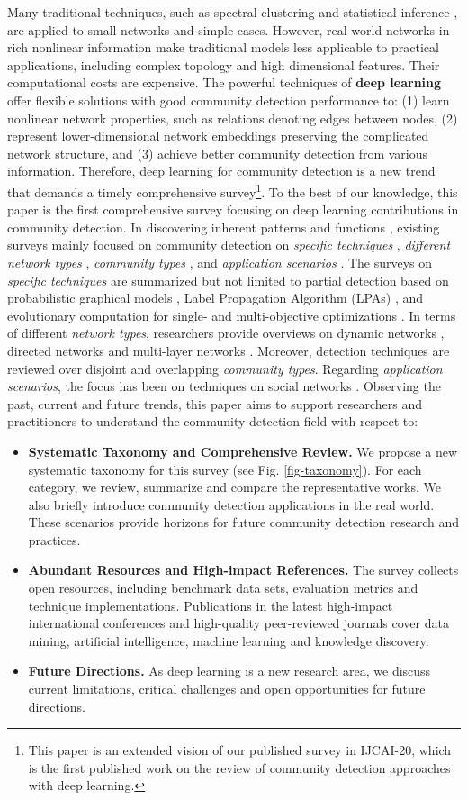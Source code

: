 Many traditional techniques, such as spectral clustering  and statistical inference , are applied to small networks and simple cases. However, real-world networks in rich nonlinear information make traditional models less applicable to practical applications, including complex topology and high dimensional features. Their computational costs are expensive. The powerful techniques of \textbf{deep learning} offer flexible solutions with good community detection performance to: (1) learn nonlinear network properties, such as relations denoting edges between nodes, (2) represent lower-dimensional network embeddings preserving the complicated network structure, and (3) achieve better community detection from various information. Therefore, deep learning for community detection is a new trend that demands a timely comprehensive survey\footnote{This paper is an extended vision of our published survey  in IJCAI-20, which is the first published work on the review of community detection approaches with deep learning.}. 
To the best of our knowledge, this paper is the first comprehensive survey focusing on deep learning contributions in community detection. In discovering inherent patterns and functions , existing surveys mainly focused on community detection on \textit{specific techniques} , \textit{different network types} , \textit{community types} , and \textit{application scenarios} . The surveys on \textit{specific techniques} are summarized but not limited to partial detection based on probabilistic graphical models , Label Propagation Algorithm (LPAs) , and evolutionary computation for single- and multi-objective optimizations . In terms of different \textit{network types}, researchers provide overviews on dynamic networks , directed networks  and multi-layer networks . Moreover, detection techniques are reviewed over disjoint and overlapping  \textit{community types}. Regarding \textit{application scenarios}, the focus has been on techniques on social networks .
Observing the past, current and future trends, this paper aims to support researchers and practitioners to understand the community detection field with respect to:
\begin{itemize}
\item \textbf{Systematic Taxonomy and Comprehensive Review.} We propose a new systematic taxonomy for this survey (see Fig. \ref{fig-taxonomy}). For each category, we review, summarize and compare the representative works. We also briefly introduce community detection applications in the real world. These scenarios provide horizons for future community detection research and practices.
\item \textbf{Abundant Resources and High-impact References.} The survey collects open resources, including benchmark data sets, evaluation metrics and technique implementations. Publications in the latest high-impact international conferences and high-quality peer-reviewed journals cover data mining, artificial intelligence, machine learning and knowledge discovery.
\item \textbf{Future Directions.} As deep learning is a new research area, we discuss current limitations, critical challenges and open opportunities for future directions.
\end{itemize}
